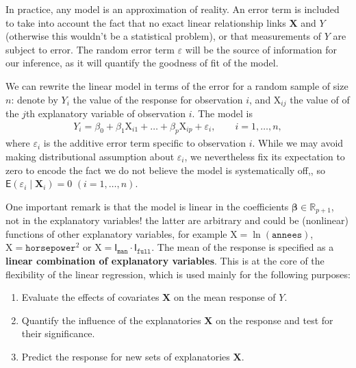 \documentclass[
  11pt,
  letterpaper,
]{book}
\providecommand{\tightlist}{%
  \setlength{\itemsep}{0pt}\setlength{\parskip}{0pt}}
\theoremstyle{definition}
\theoremstyle{definition}
\theoremstyle{definition}
\theoremstyle{remark}
\begin{document}
In practice, any model is an approximation of reality. An error term is included to take into account the fact that no exact linear relationship links \(\mathbf{X}\) and \(Y\) (otherwise this wouldn't be a statistical problem), or that measurements of \(Y\) are subject to error. The random error term \(\varepsilon\) will be the source of information for our inference, as it will quantify the goodness of fit of the model.

We can rewrite the linear model in terms of the error for a random sample of size \(n\): denote by \(Y_i\) the value of the response for observation \(i\), and \(\mathrm{X}_{ij}\) the value of of the \(j\)th explanatory variable of observation \(i\). The model is
\begin{align}
Y_i = \beta_0 + \beta_1 \mathrm{X}_{i1} + \ldots + \beta_p \mathrm{X}_{ip} +\varepsilon_{i}, \qquad i =1, \ldots, n, \label{eq:olsmean}
\end{align}
where \(\varepsilon_i\) is the additive error term specific to observation \(i\). While we may avoid making distributional assumption about \(\varepsilon_i\), we nevertheless fix its expectation to zero to encode the fact we do not believe the model is systematically off,, so \(\mathsf{E}(\varepsilon_i \mid \boldsymbol{X}_i)=0\) \((i=1, \ldots, n)\).

One important remark is that the model is linear in the coefficients \(\boldsymbol{\beta}\in \mathbb{R}_{p+1}\), not in the explanatory variables! the latter are arbitrary and could be (nonlinear) functions of other explanatory variables, for example \(\mathrm{X}=\ln(\texttt{annees})\), \(\mathrm{X}=\texttt{horsepower}^2\) or \(\mathrm{X}= \mathsf{I}_{\texttt{man}}\cdot\mathsf{I}_{\texttt{full}}\). The mean of the response is specified as a \textbf{linear combination of explanatory variables}. This is at the core of the flexibility of the linear regression, which is used mainly for the following purposes:

\begin{enumerate}
\def\labelenumi{\arabic{enumi}.}
\tightlist
\item
  Evaluate the effects of covariates \(\mathbf{X}\) on the mean response
  of \(Y\).
\item
  Quantify the influence of the explanatories \(\mathbf{X}\) on the
  response and test for their significance.
\item
  Predict the response for new sets of explanatories \(\mathbf{X}\).
\end{enumerate}
\end{document}
